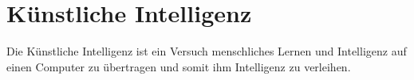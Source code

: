 \section{Künstliche Intelligenz}
\label{sec:ai}

Die Künstliche Intelligenz ist ein Versuch menschliches Lernen und Intelligenz auf einen Computer zu übertragen und somit ihm Intelligenz zu verleihen.
